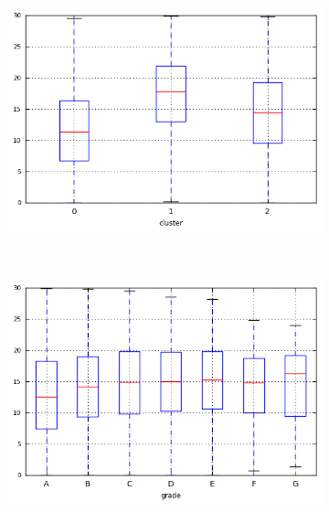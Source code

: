\begin{anexosenv}
\begin{figure}[ht!]
\begin{subfigure}[t]{0.45\textwidth}
        \end{subfigure}
\end{figure}

\begin{figure}[ht!]
    \centering
                \caption{\emph{Boxplots} de dti}
        \begin{subfigure}[t]{0.45\textwidth}
            \centering

            \centerline{\includegraphics[width=1.05\textwidth]{img/dti_by_cluster}}
        \end{subfigure}%
        ~ 
        \begin{subfigure}[t]{0.45\textwidth}
            \centering
   
            \centerline{\includegraphics[width=1.05\textwidth]{img/dti_by_grade}}


\end{subfigure}
\end{figure}
\end{anexosenv}
